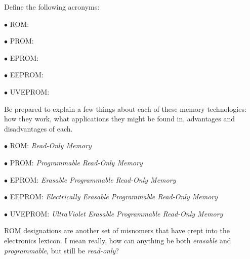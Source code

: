 

Define the following acronyms:

\medskip
\item{$\bullet$} ROM:
\item{$\bullet$} PROM:
\item{$\bullet$} EPROM:
\item{$\bullet$} EEPROM:
\item{$\bullet$} UVEPROM:
\medskip

Be prepared to explain a few things about each of these memory technologies: how they work, what applications they might be found in, advantages and disadvantages of each.







\medskip
\item{$\bullet$} ROM: {\it Read-Only Memory}
\item{$\bullet$} PROM: {\it Programmable Read-Only Memory}
\item{$\bullet$} EPROM: {\it Erasable Programmable Read-Only Memory}
\item{$\bullet$} EEPROM: {\it Electrically Erasable Programmable Read-Only Memory}
\item{$\bullet$} UVEPROM: {\it UltraViolet Erasable Programmable Read-Only Memory}
\medskip







ROM designations are another set of misnomers that have crept into the electronics lexicon.  I mean really, how can anything be both {\it erasable} and {\it programmable}, but still be {\it read-only}?




